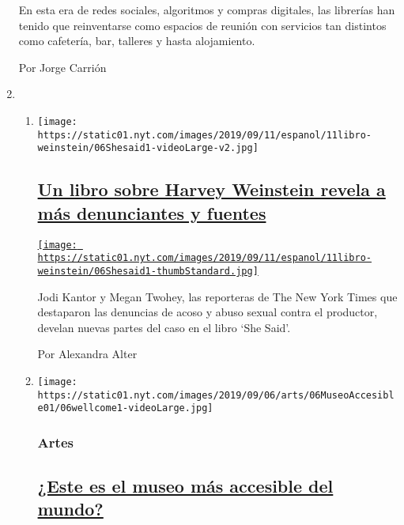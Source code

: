 \begin{enumerate}
  En esta era de redes sociales, algoritmos y compras digitales, las
  librerías han tenido que reinventarse como espacios de reunión con
  servicios tan distintos como cafetería, bar, talleres y hasta
  alojamiento.

  Por Jorge Carrión
\item
  \begin{enumerate}
  \def\labelenumii{\arabic{enumii}.}
  \item
    \texttt{[image: https://static01.nyt.com/images/2019/09/11/espanol/11libro-weinstein/06Shesaid1-videoLarge-v2.jpg]}

    \hypertarget{un-libro-sobre-harvey-weinstein-revela-a-muxe1s-denunciantes-y-fuentes}{%
    \subsection{\texorpdfstring{\href{/es/2019/09/12/espanol/mundo/harvey-weinstein-abuso-revelaciones.html}{Un
    libro sobre Harvey Weinstein revela a más denunciantes y
    fuentes}}{Un libro sobre Harvey Weinstein revela a más denunciantes y fuentes}}\label{un-libro-sobre-harvey-weinstein-revela-a-muxe1s-denunciantes-y-fuentes}}

    \href{/es/2019/09/12/espanol/mundo/harvey-weinstein-abuso-revelaciones.html}{\texttt{[image: https://static01.nyt.com/images/2019/09/11/espanol/11libro-weinstein/06Shesaid1-thumbStandard.jpg]}}

    Jodi Kantor y Megan Twohey, las reporteras de The New York Times que
    destaparon las denuncias de acoso y abuso sexual contra el
    productor, develan nuevas partes del caso en el libro `She Said'.

    Por Alexandra Alter
  \item
    \texttt{[image: https://static01.nyt.com/images/2019/09/06/arts/06MuseoAccesible01/06wellcome1-videoLarge.jpg]}

    \hypertarget{artes}{%
    \subsubsection{Artes}\label{artes}}

    \hypertarget{este-es-el-museo-muxe1s-accesible-del-mundo}{%
    \subsection{\texorpdfstring{\href{/es/2019/09/10/espanol/cultura/museo-discapacitados-wellcome-collection.html}{¿Este
    es el museo más accesible del
    mundo?}}{¿Este es el museo más accesible del mundo?}}\label{este-es-el-museo-muxe1s-accesible-del-mundo}}


\end{enumerate}
\end{enumerate}
